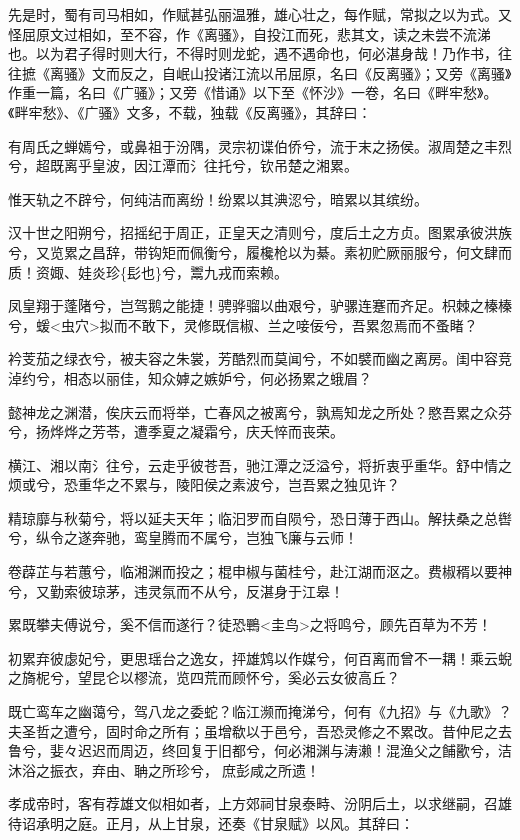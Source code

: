 \documentclass[]{article}
\begin{document}
先是时，蜀有司马相如，作赋甚弘丽温雅，雄心壮之，每作赋，常拟之以为式。又怪屈原文过相如，至不容，作《离骚》，自投江而死，悲其文，读之未尝不流涕也。以为君子得时则大行，不得时则龙蛇，遇不遇命也，何必湛身哉！乃作书，往往摭《离骚》文而反之，自岷山投诸江流以吊屈原，名曰《反离骚》；又旁《离骚》作重一篇，名曰《广骚》；又旁《惜诵》以下至《怀沙》一卷，名曰《畔牢愁》。《畔牢愁》、《广骚》文多，不载，独载《反离骚》，其辞曰：

有周氏之蝉嫣兮，或鼻祖于汾隅，灵宗初谍伯侨兮，流于末之扬侯。淑周楚之丰烈兮，超既离乎皇波，因江潭而氵往托兮，钦吊楚之湘累。

惟天轨之不辟兮，何纯洁而离纷！纷累以其淟涊兮，暗累以其缤纷。

汉十世之阳朔兮，招摇纪于周正，正皇天之清则兮，度后土之方贞。图累承彼洪族兮，又览累之昌辞，带钩矩而佩衡兮，履欃枪以为綦。素初贮厥丽服兮，何文肆而质！资娵、娃炎珍\{髟也\}兮，鬻九戎而索赖。

凤皇翔于蓬陼兮，岂驾鹅之能捷！骋骅骝以曲艰兮，驴骡连蹇而齐足。枳棘之榛榛兮，蝯\textless{}虫穴\textgreater{}拟而不敢下，灵修既信椒、兰之唼佞兮，吾累忽焉而不蚤睹？

衿芰茄之绿衣兮，被夫容之朱裳，芳酷烈而莫闻兮，不如襞而幽之离房。闺中容竞淖约兮，相态以丽佳，知众嫭之嫉妒兮，何必扬累之蛾眉？

懿神龙之渊潜，俟庆云而将举，亡春风之被离兮，孰焉知龙之所处？愍吾累之众芬兮，扬烨烨之芳苓，遭季夏之凝霜兮，庆夭悴而丧荣。

横江、湘以南氵往兮，云走乎彼苍吾，驰江潭之泛溢兮，将折衷乎重华。舒中情之烦或兮，恐重华之不累与，陵阳侯之素波兮，岂吾累之独见许？

精琼靡与秋菊兮，将以延夫天年；临汩罗而自陨兮，恐日薄于西山。解扶桑之总辔兮，纵令之遂奔驰，鸾皇腾而不属兮，岂独飞廉与云师！

卷薜芷与若蕙兮，临湘渊而投之；棍申椒与菌桂兮，赴江湖而沤之。费椒稰以要神兮，又勤索彼琼茅，违灵氛而不从兮，反湛身于江皋！

累既攀夫傅说兮，奚不信而遂行？徒恐鷤\textless{}圭鸟\textgreater{}之将鸣兮，顾先百草为不芳！

初累弃彼虙妃兮，更思瑶台之逸女，抨雄鸩以作媒兮，何百离而曾不一耦！乘云蜺之旖柅兮，望昆仑以樛流，览四荒而顾怀兮，奚必云女彼高丘？

既亡鸾车之幽蔼兮，驾八龙之委蛇？临江濒而掩涕兮，何有《九招》与《九歌》？夫圣哲之遭兮，固时命之所有；虽增欷以于邑兮，吾恐灵修之不累改。昔仲尼之去鲁兮，婓々迟迟而周迈，终回复于旧都兮，何必湘渊与涛濑！混渔父之餔歠兮，洁沐浴之振衣，弃由、聃之所珍兮，庶彭咸之所遗！

孝成帝时，客有荐雄文似相如者，上方郊祠甘泉泰畤、汾阴后土，以求继嗣，召雄待诏承明之庭。正月，从上甘泉，还奏《甘泉赋》以风。其辞曰：
\end{document}
